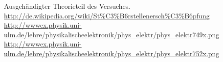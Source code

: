 Ausgehändigter Theorieteil des Versuches.
\url{http://de.wikipedia.org/wiki/St\%C3\%B6rstellenersch\%C3\%B6pfung}
\url{http://wwwex.physik.uni-ulm.de/lehre/physikalischeelektronik/phys_elektr/phys_elektr749x.png}
\url{http://wwwex.physik.uni-ulm.de/lehre/physikalischeelektronik/phys_elektr/phys_elektr752x.png}
